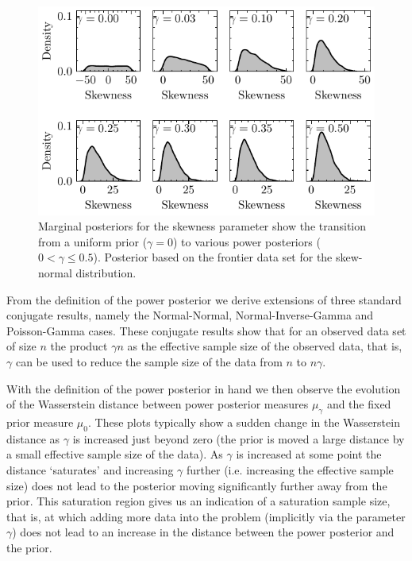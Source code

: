 \documentclass[12pt]{article}
\begin{document}
\begin{figure}
\begin{center}
\includegraphics{imgs/uniform_pow.pdf}
\end{center}
\caption{Marginal posteriors for the skewness parameter show the transition
	from a uniform prior ($\gamma=0$) to various power posteriors
	($0 < \gamma \leq 0.5$). Posterior based on the frontier data set for the
	skew-normal distribution.}\label{fig:skew_normal_powpos}
\end{figure}
From the definition of the power posterior we derive extensions of three
standard conjugate results, namely the Normal-Normal, Normal-Inverse-Gamma and
Poisson-Gamma cases. These conjugate results show that for an observed data set
of size $n$ the product $\gamma n$ as the effective sample size of the observed
data, that is, $\gamma$ can be used to reduce the sample size of the data from
$n$ to $n\gamma$. 

With the definition of the power posterior in hand we then observe the
evolution of the Wasserstein distance between power posterior measures
$\mu_{\gamma}$ and the fixed prior measure $\mu_{0}$. These plots typically show a sudden change in the Wasserstein distance as $\gamma$ is increased just beyond zero (the prior is moved a large distance by a small effective sample size of the data). As $\gamma$ is increased at some point the distance `saturates' and increasing $\gamma$ further (i.e. increasing the effective sample size) does not lead to the posterior moving significantly further away from the prior. This saturation region gives us an indication of a saturation sample size, that is, at which adding more data into the problem (implicitly
via the parameter $\gamma$) does not lead to an increase in the distance
between the power posterior and the prior. 
\end{document}
